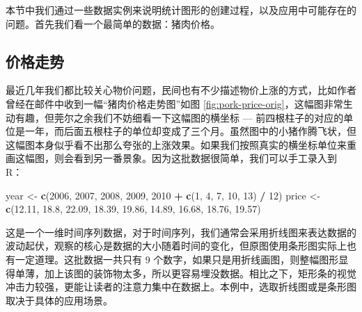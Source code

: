 \documentclass[
  b5paper,
  UTF8,twoside]{book}
\newenvironment{Shaded}{\begin{snugshade}}{\end{snugshade}}
\newcommand{\DecValTok}[1]{\textcolor[rgb]{0.00,0.00,0.81}{#1}}
\newcommand{\FloatTok}[1]{\textcolor[rgb]{0.00,0.00,0.81}{#1}}
\newcommand{\FunctionTok}[1]{\textcolor[rgb]{0.13,0.29,0.53}{\textbf{#1}}}
\newcommand{\NormalTok}[1]{#1}
\newcommand{\OtherTok}[1]{\textcolor[rgb]{0.56,0.35,0.01}{#1}}
\newcommand{\SpecialCharTok}[1]{\textcolor[rgb]{0.81,0.36,0.00}{\textbf{#1}}}
\begin{document}
本节中我们通过一些数据实例来说明统计图形的创建过程，以及应用中可能存在的问题。首先我们看一个最简单的数据：猪肉价格。

\subsection{价格走势}\label{ux4ef7ux683cux8d70ux52bf}

最近几年我们都比较关心物价问题，民间也有不少描述物价上涨的方式，比如作者曾经在邮件中收到一幅``猪肉价格走势图''如图 \ref{fig:pork-price-orig}，这幅图非常生动有趣，但莞尔之余我们不妨细看一下这幅图的横坐标 --- 前四根柱子的对应的单位是一年，而后面五根柱子的单位却变成了三个月。虽然图中的小猪作腾飞状，但这幅图本身似乎看不出那么夸张的上涨效果。如果我们按照真实的横坐标单位来重画这幅图，则会看到另一番景象。因为这批数据很简单，我们可以手工录入到 R：

\begin{Shaded}
\begin{Highlighting}[]
\NormalTok{year }\OtherTok{\textless{}{-}} \FunctionTok{c}\NormalTok{(}\DecValTok{2006}\NormalTok{, }\DecValTok{2007}\NormalTok{, }\DecValTok{2008}\NormalTok{, }\DecValTok{2009}\NormalTok{, }\DecValTok{2010} \SpecialCharTok{+} \FunctionTok{c}\NormalTok{(}\DecValTok{1}\NormalTok{, }\DecValTok{4}\NormalTok{, }\DecValTok{7}\NormalTok{, }\DecValTok{10}\NormalTok{, }\DecValTok{13}\NormalTok{) }\SpecialCharTok{/} \DecValTok{12}\NormalTok{)}
\NormalTok{price }\OtherTok{\textless{}{-}} \FunctionTok{c}\NormalTok{(}\FloatTok{12.11}\NormalTok{, }\FloatTok{18.8}\NormalTok{, }\FloatTok{22.09}\NormalTok{, }\FloatTok{18.39}\NormalTok{, }\FloatTok{19.86}\NormalTok{, }\FloatTok{14.89}\NormalTok{, }\FloatTok{16.68}\NormalTok{, }\FloatTok{18.76}\NormalTok{, }\FloatTok{19.57}\NormalTok{)}
\end{Highlighting}
\end{Shaded}

这是一个一维时间序列数据，对于时间序列，我们通常会采用折线图来表达数据的波动起伏，观察的核心是数据的大小随着时间的变化，但原图使用条形图实际上也有一定道理。这批数据一共只有 9 个数字，如果只是用折线画图，则整幅图形显得单薄，加上该图的装饰物太多，所以更容易埋没数据。相比之下，矩形条的视觉冲击力较强，更能让读者的注意力集中在数据上。本例中，选取折线图或是条形图取决于具体的应用场景。
\end{document}
